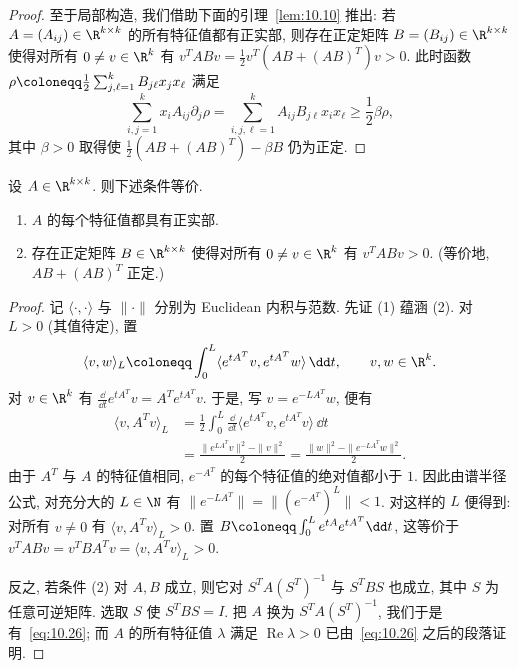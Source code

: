 \begin{proof}
至于局部构造, 我们借助下面的引理~\ref{lem:10.10} 推出: 若 $A = (A_{ij}) \in \R^{k \times k}$ 的所有特征值都有正实部, 则存在正定矩阵 $B = (B_{ij}) \in \R^{k \times k}$ 使得对所有 $0 \neq v \in \R^k$ 有 $v^T A B v = \frac{1}{2} v^T (AB + (AB)^T) v > 0$. 此时函数 $\rho \defeq \frac{1}{2}\sum_{j,\ell=1}^{k} B_{j\ell} x_j x_\ell$ 满足
\begin{equation}\label{eq:10.29}
    \sum_{i,j=1}^{k} x_i A_{ij} \partial_j \rho = \sum_{i,j,\ell=1}^{k} A_{ij} B_{j\ell} x_i x_\ell \ge \frac{1}{2}\beta \rho,
\end{equation}
其中 $\beta > 0$ 取得使 $\frac{1}{2}(AB + (AB)^T) - \beta B$ 仍为正定.
\end{proof}

\begin{lemma}\label{lem:10.10}
设 $A \in \R^{k \times k}$. 则下述条件等价.
\begin{enumerate}
    \item $A$ 的每个特征值都具有正实部.
    \item 存在正定矩阵 $B \in \R^{k \times k}$ 使得对所有 $0 \neq v \in \R^k$ 有 $v^T A B v > 0$. (等价地, $AB + (AB)^T$ 正定.)
\end{enumerate}
\end{lemma}

\begin{proof}
记 $\langle \cdot, \cdot \rangle$ 与 $\|\cdot\|$ 分别为 Euclidean 内积与范数. 先证 (1) 蕴涵 (2). 对 $L > 0$ (其值待定), 置
\begin{equation}\label{eq:10.30}
    \langle v, w \rangle_L \defeq \int_0^L \langle e^{tA^T} v, e^{tA^T} w \rangle \, \dd t, \qquad v, w \in \R^k.
\end{equation}
对 $v \in \R^k$ 有 $\frac{\dd}{\dd t} e^{tA^T} v = A^T e^{tA^T} v$. 于是, 写 $v = e^{-LA^T} w$, 便有
\begin{equation}\label{eq:10.31}
    \begin{aligned}
        \langle v, A^T v \rangle_L &= \frac{1}{2}\int_0^L \frac{\dd}{\dd t} \langle e^{tA^T} v, e^{tA^T} v \rangle \, \dd t \\
        &= \frac{\|e^{LA^T} v\|^2 - \|v\|^2}{2} = \frac{\|w\|^2 - \|e^{-LA^T} w\|^2}{2}.
    \end{aligned}
\end{equation}
由于 $A^T$ 与 $A$ 的特征值相同, $e^{-A^T}$ 的每个特征值的绝对值都小于 $1$. 因此由谱半径公式, 对充分大的 $L \in \N$ 有 $\|e^{-LA^T}\| = \|(e^{-A^T})^L\| < 1$. 对这样的 $L$ 便得到: 对所有 $v \neq 0$ 有 $\langle v, A^T v \rangle_L > 0$. 置 $B \defeq \int_0^L e^{tA} e^{tA^T} \dd t$, 这等价于 $v^T A B v = v^T B A^T v = \langle v, A^T v \rangle_L > 0$.

反之, 若条件 (2) 对 $A, B$ 成立, 则它对 $S^T A (S^T)^{-1}$ 与 $S^T B S$ 也成立, 其中 $S$ 为任意可逆矩阵. 选取 $S$ 使 $S^T B S = I$. 把 $A$ 换为 $S^T A (S^T)^{-1}$, 我们于是有~\eqref{eq:10.26}; 而 $A$ 的所有特征值 $\lambda$ 满足 $\operatorname{Re}\lambda > 0$ 已由~\eqref{eq:10.26} 之后的段落证明.
\end{proof}

